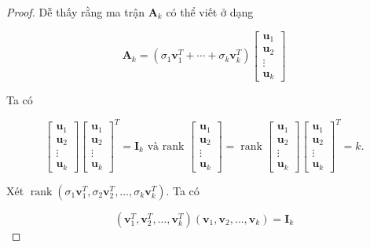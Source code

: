 \documentclass[14pt,oneside,a4paper]{report}
\numberwithin{equation}{section}
\begin{document}
\begin{proof}
Dễ thấy rằng ma trận $\mathbf{A}_{k}$ có thể viết ở dạng

$$
\mathbf{A}_{k}=\left(\sigma_{1} \mathbf{v}_{1}^{T}+\cdots+\sigma_{k} \mathbf{v}_{k}^{T}\right)\left[\begin{array}{c}
	\mathbf{u}_{1} \\
	\mathbf{u}_{2} \\
	\vdots \\
	\mathbf{u}_{k}
\end{array}\right]
$$

Ta có

$$
\left[\begin{array}{c}
	\mathbf{u}_{1} \\
	\mathbf{u}_{2} \\
	\vdots \\
	\mathbf{u}_{k}
\end{array}\right]\left[\begin{array}{c}
	\mathbf{u}_{1} \\
	\mathbf{u}_{2} \\
	\vdots \\
	\mathbf{u}_{k}
\end{array}\right]^{T}=\mathbf{I}_{k} \text { và rank }\left[\begin{array}{c}
	\mathbf{u}_{1} \\
	\mathbf{u}_{2} \\
	\vdots \\
	\mathbf{u}_{k}
\end{array}\right]=\operatorname{rank}\left[\begin{array}{c}
	\mathbf{u}_{1} \\
	\mathbf{u}_{2} \\
	\vdots \\
	\mathbf{u}_{k}
\end{array}\right]\left[\begin{array}{c}
	\mathbf{u}_{1} \\
	\mathbf{u}_{2} \\
	\vdots \\
	\mathbf{u}_{k}
\end{array}\right]^{T}=k .
$$

Xét $\operatorname{rank}\left(\sigma_{1} \mathbf{v}_{1}^{T}, \sigma_{2} \mathbf{v}_{2}^{T}, \ldots, \sigma_{k} \mathbf{v}_{k}^{T}\right)$. Ta có

$$
\left(\mathbf{v}_{1}^{T}, \mathbf{v}_{2}^{T}, \ldots, \mathbf{v}_{k}^{T}\right)\left(\mathbf{v}_{1}, \mathbf{v}_{2}, \ldots, \mathbf{v}_{k}\right)=\mathbf{I}_{k}
$$


\end{proof}
\end{document}
